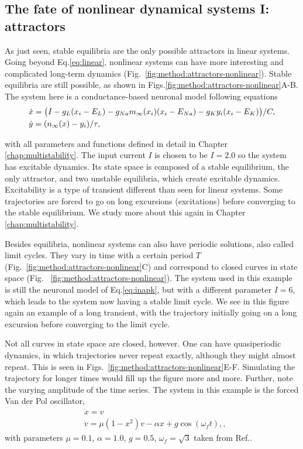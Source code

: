 \subsection{The fate of nonlinear dynamical systems I: attractors}\label{method:nonlinear-I}
As just seen, stable equilibria are the only possible attractors in linear systems. Going beyond Eq.\ref{eq:linear}, nonlinear systems can have more interesting and complicated long-term dynamics (Fig.~\ref{fig:method:attractors-nonlinear}). Stable equilibria are still possible, as shown in Figs.\ref{fig:method:attractors-nonlinear}A-B. The system here is a conductance-based neuronal model following equations \cite{izhikevichbook}
%
\begin{align}
    &\dot{x} = \big(I - g_L (x_i - E_L)  
    - g_{Na} m_\infty(x_i) (x_i - E_{Na}) 
    -g_K y_i (x_i - E_K) \big)/C, \notag\\
    &\dot{y} = (n_\infty(x) - y_i) / \tau,
    \label{eq:inapk}
\end{align}

with all parameters and functions defined in detail in Chapter \ref{chap:multistability}. The input current $I$ is chosen to be $I=2.0$ so the system has excitable dynamics. Its state space is composed of a stable equilibrium, the only attractor, and two unstable equilibria, which create excitable dynamics. Excitability is a type of transient different than seen for linear systems. Some trajectories are forced to go on long excursions (excitations) before converging to the stable equilibrium. We study more about this again in Chapter \ref{chap:multistability}.

Besides equilibria, nonlinear systems can also have periodic solutions, also called limit cycles. They vary in time with a certain period $T$ (Fig.~\ref{fig:method:attractors-nonlinear}C) and correspond to closed curves in state space (Fig.~ \ref{fig:method:attractors-nonlinear}). The system used in this example is still the neuronal model of Eq.\ref{eq:inapk}, but with a different parameter $I=6$, which leads to the system now having a stable limit cycle. We see in this figure again an example of a long transient, with the trajectory initially going on a long excursion before converging to the limit cycle.

Not all curves in state space are closed, however. One can have quasiperiodic dynamics, in which trajectories never repeat exactly, although they might almost repeat. This is seen in Figs.~\ref{fig:method:attractors-nonlinear}E-F. Simulating the trajectory for longer times would fill up the figure more and more. Further, note the varying amplitude of the time series. The system in this example is the forced Van der Pol oscillator, 
%
\begin{align}
    &\dot{x} = v \\
    &\dot{v} = \mu (1-x^2)v - \alpha x + g \cos(\omega_f t),
    \label{eq:vanderpol},
\end{align}
with parameters $\mu=0.1$, $\alpha=1.0$, $g=0.5$, $\omega_f=\sqrt{3}$ taken from Ref.\cite{shukla2014a}.


